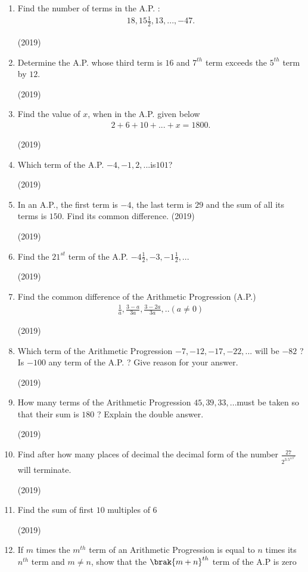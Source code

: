 \begin{enumerate}[label=\thesubsection.\arabic*,ref=\thesubsection.\theenumi,itemsep=1pt]
 \item Find the number of terms in the A.P. :
\begin{align*}
    18,15\frac{1}{2},13, ...,-47.
\end{align*}

\hfill (2019) \item Determine the A.P. whose third term is $16$ and $7^{th}$ term exceeds the $5^{th}$ term by $12$.

\hfill (2019) \item Find the value of $x$, when in the A.P. given below
\begin{align*}
2 + 6 + 10 + ... + x = 1800.    
\end{align*}

\hfill (2019) \item Which term of the A.P. $-4, - 1, 2, ... $is$ 101$?

\hfill (2019) \item In an A.P., the first term is $- 4$, the last term is $29$ and the sum of all its terms is $150$. Find its common difference.
\hfill (2019)

\hfill (2019) \item Find the $21^{st}$ term of the A.P. $-4 \frac{1}{2},-3,-1\frac{1}{2},...$

\hfill (2019) \item Find the common difference of the Arithmetic Progression (A.P.) 
\begin{align*}
\frac{1}{a} , \frac{3-a}{3a},\frac{3-2a}{3a} , . . (a \neq 0)
\end{align*}

\hfill (2019) \item Which term of the Arithmetic Progression $-7, -12, -17, -22, ... $ will be $-82$ ? Is $-100$ any term of the A.P. ? Give reason for your answer.

\hfill (2019) \item How many terms of the Arithmetic Progression $45, 39, 33, ... $must be taken so that their sum is $180$ ? Explain the double answer.

\hfill (2019) \item Find after how many places of decimal the decimal form of the number $\frac {27}{2^3.5^4.3^2}$ will terminate.

\hfill (2019) \item Find the sum of first $10$ multiples of $6$

\hfill (2019) \item If $m$ times the $m^{th}$ term of an Arithmetic Progression is equal to $n$ times
its $n^{th}$ term and $m \neq n$, show that the $\brak{m + n}^{th}$ term of the A.P is zero


\end{enumerate}
